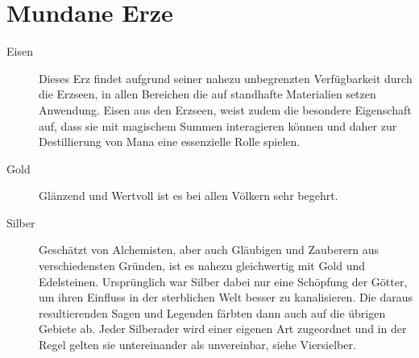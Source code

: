 \documentclass[a4paper,12pt,oneside]{book}
\begin{document}
\section{Mundane Erze}
\begin{description}
\item[Eisen]Dieses Erz findet aufgrund seiner nahezu unbegrenzten Verfügbarkeit durch die Erzseen, in allen Bereichen die auf standhafte Materialien setzen Anwendung. Eisen aus den Erzseen, weist zudem die besondere Eigenschaft auf, dass sie mit magischem Summen interagieren können und daher zur Destillierung von Mana eine essenzielle Rolle spielen.
\item[Gold]Glänzend und Wertvoll ist es bei allen Völkern sehr begehrt. 
\item[Silber]Geschätzt von Alchemisten, aber auch Gläubigen und Zauberern aus verschiedensten Gründen, ist es nahezu gleichwertig mit Gold und Edelsteinen. Ursprünglich war Silber dabei nur eine Schöpfung der Götter, um ihren Einfluss in der sterblichen Welt besser zu kanalisieren. Die daraus resultierenden Sagen und Legenden färbten dann auch auf die übrigen Gebiete ab. Jeder Silberader wird einer eigenen Art zugeordnet und in der Regel gelten sie untereinander als unvereinbar, siehe Viersielber.    
\end{description}
\end{document}
